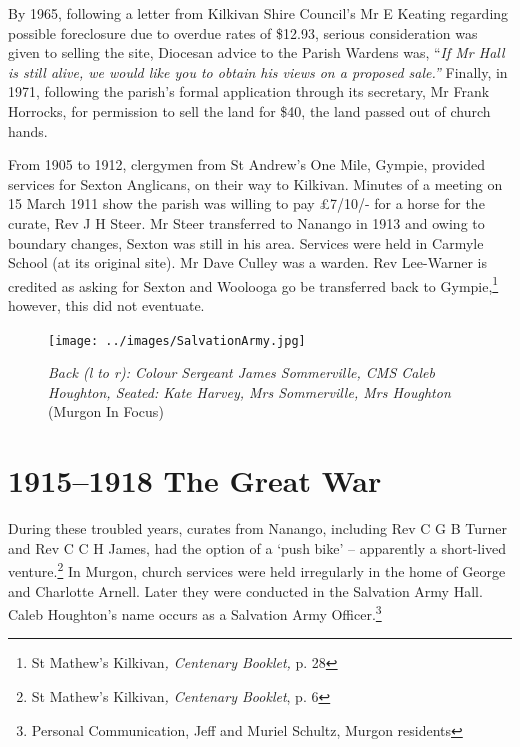 By 1965, following a letter from Kilkivan Shire Council's Mr E Keating regarding possible foreclosure due to overdue rates of \$12.93, serious consideration was given to selling the site, Diocesan advice to the Parish Wardens was, ``\emph{If Mr Hall is still alive, we would like you to obtain his views on a proposed sale.''} Finally, in 1971, following the parish's formal application through its secretary, Mr Frank Horrocks, for permission to sell the land for \$40, the land passed out of church hands.



From 1905 to 1912, clergymen from St Andrew's One Mile, Gympie, provided services for Sexton Anglicans, on their way to Kilkivan. Minutes of a meeting on 15 March 1911 show the parish was willing to pay \pounds7/10/- for a horse for the curate, Rev J H Steer. Mr Steer transferred to Nanango in 1913 and owing to boundary changes, Sexton was still in his area. Services were held in Carmyle School (at its original site). Mr Dave Culley was a warden. Rev Lee-Warner is credited as asking for Sexton and Woolooga go be transferred back to Gympie,\footnote{St Mathew's Kilkivan\emph{, Centenary Booklet,} p. 28} however, this did not eventuate.








\begin{figure}[htb]
\begin{center}
\texttt{[image: ../images/SalvationArmy.jpg]}
\caption{{\itshape Back (l to r): Colour Sergeant James Sommerville, CMS Caleb Houghton, Seated: Kate Harvey, Mrs Sommerville, Mrs Houghton} {\scriptsize(Murgon In Focus)}}
\end{center}
\end{figure}




\section{1915--1918 The Great War}



During these troubled years, curates from Nanango, including Rev C G B Turner and Rev C C H James, had the option of a `push bike' -- apparently a short-lived venture.\footnote{St Mathew's Kilkivan\emph{, Centenary Booklet}, p. 6} In Murgon, church services were held irregularly in the home of George and Charlotte Arnell. Later they were conducted in the Salvation Army Hall. Caleb Houghton's name occurs as a Salvation Army Officer.\footnote{Personal Communication, Jeff and Muriel Schultz, Murgon residents}


